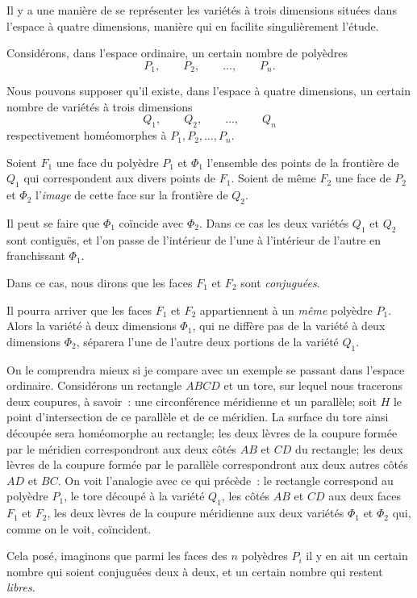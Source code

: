 \documentclass{article}
\begin{document}
Il y a une manière de se représenter les variétés à trois dimensions situées dans l'espace à quatre dimensions, manière qui en facilite singulièrement l'étude.

Considérons, dans l'espace ordinaire, un certain nombre de polyèdres
\[
P_{1}, \qquad P_{2}, \qquad \ldots, \qquad P_{n}.
\]

Nous pouvons supposer qu'il existe, dans l'espace à quatre dimensions, un certain nombre de variétés à trois dimensions
\[
Q_{1}, \qquad Q_{2}, \qquad \ldots, \qquad Q_{n}
\]
respectivement homéomorphes à $P_{1}, P_{2}, \ldots, P_{n}$.

Soient $F_{1}$ une face du polyèdre $P_{1}$ et $\Phi_{1}$ l'ensemble des points de la frontière de $Q_{1}$ qui correspondent aux divers points de $F_{1}$. Soient de même $F_{2}$ une face de $P_{2}$ et $\Phi_{2}$ l'\emph{image} de cette face sur la frontière de $Q_{2}$.

Il peut se faire que $\Phi_{1}$ coïncide avec $\Phi_{2}$. Dans ce cas les deux variétés $Q_{1}$ et $Q_{2}$ sont contiguës, et l'on passe de l'intérieur de l'une à l'intérieur de l'autre en franchissant $\Phi_{1}$.

Dans ce cas, nous dirons que les faces $F_{1}$ et $F_{2}$ sont \emph{conjuguées}.

Il pourra arriver que les faces $F_{1}$ et $F_{2}$ appartiennent à un \emph{même} polyèdre $P_{1}$. Alors la variété à deux dimensions $\Phi_{1}$, qui ne diffère pas de la variété à deux dimensions $\Phi_{2}$, séparera l'une de l'autre deux portions de la variété $Q_{1}$.

On le comprendra mieux si je compare avec un exemple se passant dans l'espace ordinaire. Considérons un rectangle $ABCD$ et un tore, sur lequel nous tracerons deux coupures, à savoir~: une circonférence méridienne et un parallèle; soit $H$ le point d'intersection de ce parallèle et de ce méridien. La surface du tore ainsi découpée sera homéomorphe au rectangle; les deux lèvres de la coupure formée par le méridien correspondront aux deux côtés $AB$ et $CD$ du rectangle; les deux lèvres de la coupure formée par le parallèle correspondront aux deux autres côtés $AD$ et $BC$. On voit l'analogie avec ce qui précède~: le rectangle correspond au polyèdre $P_{1}$, le tore découpé à la variété $Q_{1}$, les côtés $AB$ et $CD$ aux deux faces $F_{1}$ et $F_{2}$, les deux lèvres de la coupure méridienne aux deux variétés $\Phi_{1}$ et $\Phi_{2}$ qui, comme on le voit, coïncident.

Cela posé, imaginons que parmi les faces des $n$ polyèdres $P_{i}$ il y en ait
un certain nombre qui soient conjuguées deux à deux, et un certain nombre qui restent \emph{libres}.
\end{document}
